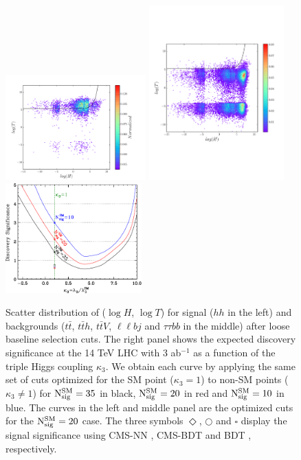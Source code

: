 \begin{figure}[t]
\centering
\includegraphics[width=5.4cm]{./section3/plots/Scatter_hh_Zero_BaseLineSel.pdf}   \hspace*{-0.525cm}
\includegraphics[width=5.2cm]{./section3/plots/Scatter_BGD_Zero_BaseLineSel.pdf} \hspace*{-0.1cm}
\includegraphics[width=5.25cm]{./section3/plots/kappa3_report.pdf} 
\caption{\label{fig:scatter} 
Scatter distribution of ($\log H$, $\log T$) for signal ($hh$ in the left) and backgrounds ($t \bar t$, $t\bar t h$, $t \bar t V$, $\ell\ell b j$ and $\tau\tau b b$ in the middle) after loose baseline selection cuts.
The right panel shows the expected discovery significance at the 14 TeV LHC with 3 ab$^{-1}$ as a function of the triple Higgs coupling $\kappa_3$.
We obtain each curve by applying the same set of cuts optimized for the SM point ($\kappa_3=1$) to non-SM points ($\kappa_3 \neq 1$) for ${\rm N_{sig}^{SM}}=35$ in black, ${\rm N_{sig}^{SM}}=20$ in red and ${\rm N_{sig}^{SM}}=10$ in blue.
The curves in the left and middle panel are the optimized cuts for the ${\rm N_{sig}^{SM}}=20$ case.
The three symbols {\color{red}$\Diamond$}, {\color{black}$\bigcirc$} and {\color{blue}$\square$} display the signal significance 
using CMS-NN \cite{CMS:2015nat}, CMS-BDT \cite{CMS:2017cwx} and BDT \cite{Adhikary:2017jtu}, respectively.
}
\end{figure}
%

